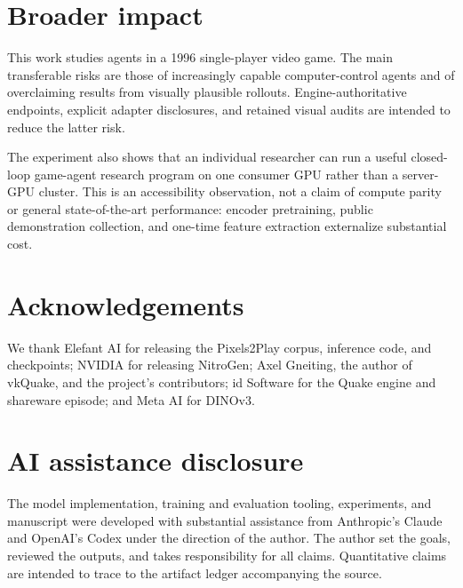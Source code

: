 \documentclass[11pt]{article}
\begin{document}
\section*{Broader impact}

This work studies agents in a 1996 single-player video game. The main transferable risks are those of increasingly capable computer-control agents and of overclaiming results from visually plausible rollouts. Engine-authoritative endpoints, explicit adapter disclosures, and retained visual audits are intended to reduce the latter risk.

The experiment also shows that an individual researcher can run a useful closed-loop game-agent research program on one consumer GPU rather than a server-GPU cluster. This is an accessibility observation, not a claim of compute parity or general state-of-the-art performance: encoder pretraining, public demonstration collection, and one-time feature extraction externalize substantial cost.

\section*{Acknowledgements}

We thank Elefant AI for releasing the Pixels2Play corpus, inference code, and checkpoints; NVIDIA for releasing NitroGen; Axel Gneiting, the author of vkQuake, and the project's contributors; id Software for the Quake engine and shareware episode; and Meta AI for DINOv3.

\section*{AI assistance disclosure}

The model implementation, training and evaluation tooling, experiments, and manuscript were developed with substantial assistance from Anthropic's Claude and OpenAI's Codex under the direction of the author. The author set the goals, reviewed the outputs, and takes responsibility for all claims. Quantitative claims are intended to trace to the artifact ledger accompanying the source.
\end{document}
